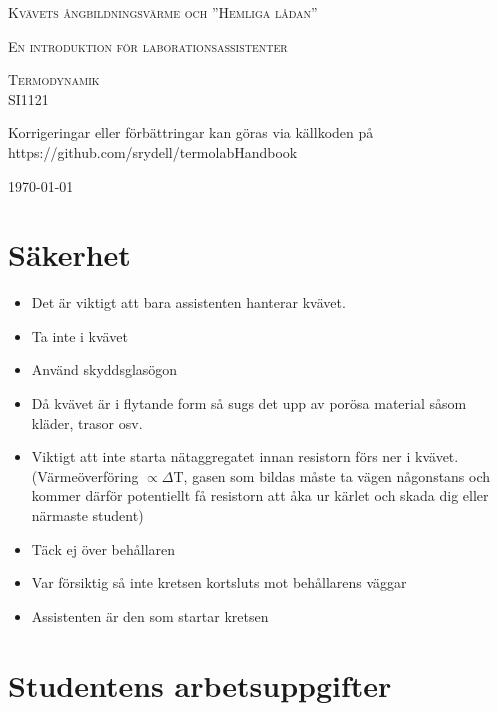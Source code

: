 \documentclass[11pt]{article}
\begin{document}
\begin{titlepage}
	\centering
	{\scshape\LARGE Kvävets ångbildningsvärme och ”Hemliga lådan” \par}
	{\scshape En introduktion för laborationsassistenter \par}
	\vspace{4cm}
	{\scshape\Large Termodynamik \\ SI1121\par}
	\vspace{10cm}
	{ Korrigeringar eller förbättringar kan göras via källkoden på \\ https://github.com/srydell/termolabHandbook\par}
	\vfill
	{\large \today\par}
\end{titlepage}


\section{Säkerhet}
 
\begin{itemize}
    \item Det är viktigt att bara assistenten hanterar kvävet.
    \item Ta inte i kvävet
    \item Använd skyddsglasögon
    \item Då kvävet är i flytande form så sugs det upp av porösa material såsom kläder, trasor osv.
    \item Viktigt att inte starta nätaggregatet innan resistorn förs ner i kvävet. (Värmeöverföring $\propto \Delta $T, gasen som bildas måste ta vägen någonstans och kommer därför potentiellt få resistorn att åka ur kärlet och skada dig eller närmaste student)
    \item Täck ej över behållaren
    \item Var försiktig så inte kretsen kortsluts mot behållarens väggar
    \item Assistenten är den som startar kretsen
\end{itemize}

\section{Studentens arbetsuppgifter}
\end{document}
